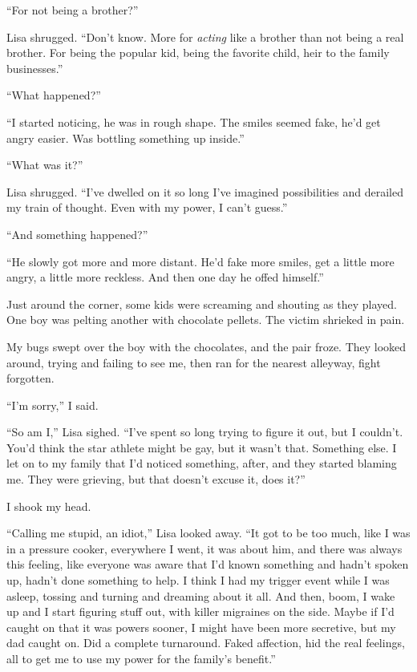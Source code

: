``For not being a brother?''



Lisa shrugged.  ``Don't know.  More for \emph{acting} like a brother than not being a real brother.  For being the popular kid, being the favorite child, heir to the family businesses.''



``What happened?''



``I started noticing, he was in rough shape.  The smiles seemed fake, he'd get angry easier.  Was bottling something up inside.''



``What was it?''



Lisa shrugged.  ``I've dwelled on it so long I've imagined possibilities and derailed my train of thought.  Even with my power, I can't guess.''



``And something happened?''



``He slowly got more and more distant.  He'd fake more smiles, get a little more angry, a little more reckless.  And then one day he offed himself.''



Just around the corner, some kids were screaming and shouting as they played.  One boy was pelting another with chocolate pellets.  The victim shrieked in pain.



My bugs swept over the boy with the chocolates, and the pair froze.  They looked around, trying and failing to see me, then ran for the nearest alleyway, fight forgotten.



``I'm sorry,'' I said.



``So am I,'' Lisa sighed.  ``I've spent so long trying to figure it out, but I couldn't.  You'd think the star athlete might be gay, but it wasn't that.  Something else.  I let on to my family that I'd noticed something, after, and they started blaming me.  They were grieving, but that doesn't excuse it, does it?''



I shook my head.



``Calling me stupid, an idiot,'' Lisa looked away.  ``It got to be too much, like I was in a pressure cooker, everywhere I went, it was about him, and there was always this feeling, like everyone was aware that I'd known something and hadn't spoken up, hadn't done something to help.  I think I had my trigger event while I was asleep, tossing and turning and dreaming about it all.  And then, boom, I wake up and I start figuring stuff out, with killer migraines on the side.  Maybe if I'd caught on that it was powers sooner, I might have been more secretive, but my dad caught on.  Did a complete turnaround.  Faked affection, hid the real feelings, all to get me to use my power for the family's benefit.''



